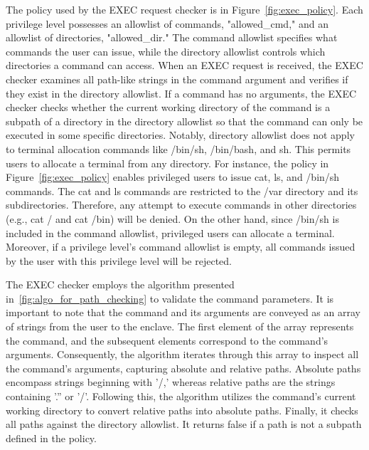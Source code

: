 The policy used by the EXEC request checker is in Figure~\ref{fig:exec_policy}. Each privilege level possesses an allowlist of commands, "allowed\_cmd," and an allowlist of directories, "allowed\_dir." The command allowlist specifies what commands the user can issue, while the 
directory allowlist controls which directories a command can access. When an EXEC request is received, the EXEC checker examines all path-like strings in the command argument and verifies if they exist in the directory allowlist. If a command has no arguments, the EXEC checker checks whether the current working directory of 
the command is a subpath of a directory in the directory allowlist so that the command can only be executed in some specific directories. Notably, directory allowlist does not apply to terminal allocation commands like /bin/sh, /bin/bash, and sh. This permits users to allocate a terminal 
from any directory. For instance, the policy in Figure~\ref{fig:exec_policy} enables privileged users to issue cat, ls, and /bin/sh commands. The cat and ls commands are restricted to the /var directory and its subdirectories. Therefore, any attempt to execute commands in other directories (e.g., cat / and cat /bin) will be denied. 
On the other hand, since /bin/sh is included in the command allowlist, privileged users can allocate a terminal. Moreover, if a privilege level's command allowlist is empty, all commands issued by the user with this privilege level will be rejected.



The EXEC checker employs the algorithm presented in~\ref{fig:algo_for_path_checking} to validate the command parameters. It is important to note that the command and its arguments are conveyed as an array of strings from the user to the enclave. The first element of the array represents the command, and the subsequent elements 
correspond to the command's arguments. Consequently, the algorithm iterates through this array to inspect all the command's arguments, capturing absolute and relative paths. Absolute paths encompass strings beginning with '/,' whereas relative paths are the strings containing '.'' or '/'. Following 
this, the algorithm utilizes the command's current working directory to convert relative paths into absolute paths. Finally, it checks all paths against the directory allowlist. It returns false if a path is not a subpath defined in the policy.



